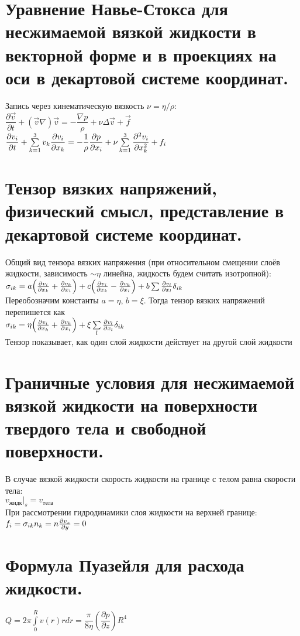 \begin{multicols*}{2}
		\section{Уравнение Навье-Стокса для несжимаемой вязкой жидкости в векторной форме и в проекциях на оси в декартовой системе координат.}
		Запись через кинематическую вязкость $\nu=\eta/\rho$:\\
		$\dfrac{\partial \vec{v}}{\partial t}+(\vec{v} \nabla)\vec{v} = -\dfrac{\nabla p}{\rho}+\nu \Delta \vec{v} + \vec{f} $\\
		$\dfrac{\partial {v_i}}{\partial t} + \sum\limits_{k=1}^3 v_k \dfrac{\partial {v_i}}{\partial x_k} = -\dfrac{1}{\rho}\dfrac{\partial p }{\partial x_i} + \nu\sum\limits_{k=1}^3\dfrac{\partial^2 {v_i}}{\partial {x^2_k}} + f_i$
		
		\section{Тензор вязких напряжений, физический смысл, представление в декартовой системе координат.}
		Общий вид тензора вязких напряжения (при относительном смещении слоёв жидкости, зависимость $\sim\eta$ линейна, жидкость будем считать изотропной): \\
		$\sigma_{ik} = a\qty(\pdv{v_i}{x_k}+\pdv{v_k}{x_i})+c\qty(\pdv{v_i}{x_k}-\pdv{v_k}{x_i})+b\sum \pdv{v_l}{x_l} \delta_{ik}$ \\
		Переобозначим константы $a=\eta$, $b=\xi$. Тогда тензор вязких напряжений перепишется как\\
		$ \sigma_{ik} = \eta \qty(\pdv{v_i}{x_k}+\pdv{v_k}{x_i})+\xi \sum\limits_l \pdv{v_l}{x_l} \delta_{ik} $\\
		Тензор показывает, как один слой жидкости действует на другой слой жидкости 
		
		\section{Граничные условия для несжимаемой вязкой жидкости на поверхности твердого тела и свободной поверхности.}
		В случае вязкой жидкости скорость жидкости на границе с телом равна скорости тела: \\
		$v_\text{жидк}|_s=v_\text{тела}$\\
		При рассмотрении гидродинамики слоя жидкости на верхней границе: \\
		$ f_i = \sigma_{ik} n_k = n\pdv{v_x}{y} = 0 $
		
		\section{Формула Пуазейля для расхода жидкости.}
		$Q=2\pi\int\limits_0^Rv(r)rdr=\dfrac{\pi}{8\eta}\left(\dfrac{\partial p}{\partial z}\right)R^4$
		

\end{multicols*}
